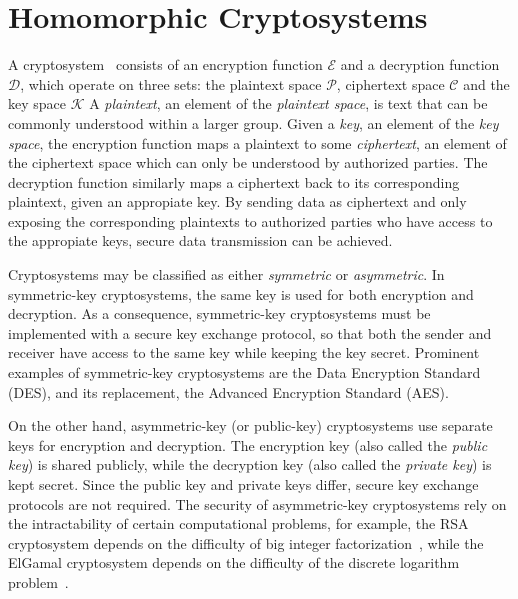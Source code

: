 \section{Homomorphic Cryptosystems}

A cryptosystem~\cite{bauer_cryptosystem_2005} consists of an encryption function $\mathcal{E}$ and a decryption function $\mathcal{D}$, which operate on three sets: the plaintext space $\mathcal{P}$, ciphertext space $\mathcal{C}$ and the key space $\mathcal{K}$ A \textit{plaintext}, an element of the \textit{plaintext space}, is text that can be commonly understood within a larger group. Given a \textit{key}, an element of the \textit{key space}, the encryption function maps a plaintext to some \textit{ciphertext}, an element of the ciphertext space which can only be understood by authorized parties. The decryption function similarly maps a ciphertext back to its corresponding plaintext, given an appropiate key. By sending data as ciphertext and only exposing the corresponding plaintexts to authorized parties who have access to the appropiate keys, secure data transmission can be achieved.

Cryptosystems may be classified as either \textit{symmetric} or \textit{asymmetric}. 
In symmetric-key cryptosystems, the same key is used for both encryption and decryption. As a consequence, symmetric-key cryptosystems must be implemented with a secure key exchange protocol, so that both the sender and receiver have access to the same key while keeping the key secret. 
Prominent examples of symmetric-key cryptosystems are the Data Encryption Standard (DES), and its replacement, the Advanced Encryption Standard (AES).

On the other hand, asymmetric-key (or public-key) cryptosystems use separate keys for encryption and decryption. The encryption key (also called the \textit{public key}) is shared publicly, while the decryption key (also called the \textit{private key}) is kept secret. Since the public key and private keys differ, secure key exchange protocols are not required. The security of asymmetric-key cryptosystems rely on the intractability of certain computational problems, for example, the RSA cryptosystem depends on the difficulty of big integer factorization~\cite{rivest_method_1978}, while the ElGamal cryptosystem depends on the difficulty of the discrete logarithm problem~\cite{blakley_public_1985}.

